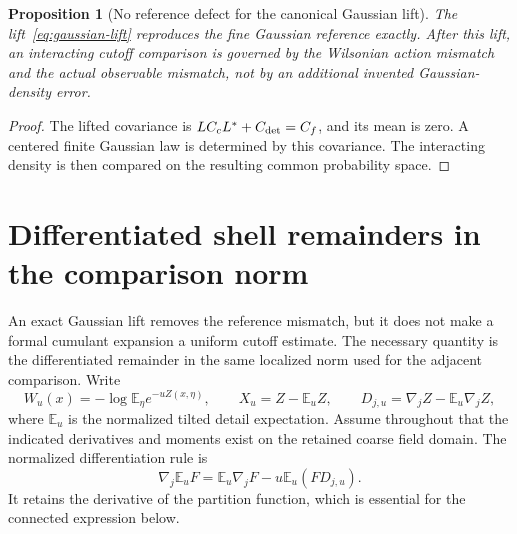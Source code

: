 \documentclass[11pt,a4paper,oneside]{book}
\theoremstyle{plain}
\newtheorem{proposition}[theorem]{Proposition}
\theoremstyle{definition}
\theoremstyle{remark}
\newcommand{\E}{\mathbb E}
\begin{document}
\begin{proposition}[No reference defect for the canonical Gaussian lift]
\label{prop:gaussian-lift}
The lift~\eqref{eq:gaussian-lift} reproduces the fine Gaussian reference exactly. After this lift, an interacting cutoff comparison is governed by the Wilsonian action mismatch and the actual observable mismatch, not by an additional invented Gaussian-density error.
\end{proposition}
\begin{proof}
The lifted covariance is $LC_cL^*+C_{\rm det}=C_f$, and its mean is zero. A centered finite Gaussian law is determined by this covariance. The interacting density is then compared on the resulting common probability space.
\end{proof}
\cite{R16}

\section{Differentiated shell remainders in the comparison norm}
An exact Gaussian lift removes the reference mismatch, but it does not make
a formal cumulant expansion a uniform cutoff estimate.  The necessary
quantity is the differentiated remainder in the same localized norm used
for the adjacent comparison.  Write
\begin{equation}
 W_u(x)=-\log\E_\eta e^{-uZ(x,\eta)},\qquad
 X_u=Z-\E_uZ,\qquad D_{j,u}=\nabla_jZ-\E_u\nabla_jZ,
 \label{eq:localized-shell-tilt}
\end{equation}
where $\E_u$ is the normalized tilted detail expectation.  Assume throughout
that the indicated derivatives and moments exist on the retained coarse
field domain.  The normalized differentiation rule is
\begin{equation}
 \nabla_j\E_uF=\E_u\nabla_jF-u\E_u(FD_{j,u}).
 \label{eq:normalized-shell-derivative}
\end{equation}
It retains the derivative of the partition function, which is essential
for the connected expression below.
\end{document}
